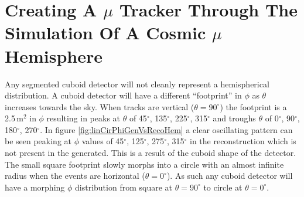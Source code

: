 \section{Creating A $\mu$ Tracker Through The Simulation Of A Cosmic $\mu$ Hemisphere}\label{sec:SimulationOfCosmics}
Any segmented cuboid detector will not cleanly represent a hemispherical distribution. 
A cuboid detector will have a different ``footprint'' in $\phi$ as $\theta$ increases towards the sky. When tracks are vertical ($\theta = 90^\circ$) the footprint is a 2.5\,m$^2$ in $\phi$ resulting in peaks at $\theta$ of 45$^\circ$, 135$^\circ$, 225$^\circ$, 315$^\circ$ and troughs $\theta$ of 0$^\circ$, 90$^\circ$, 180$^\circ$, 270$^\circ$. In figure \ref{fig:linCirPhiGenVsRecoHem} a clear oscillating pattern can be seen peaking at $\phi$ values of 45$^\circ$, 125$^\circ$, 275$^\circ$, 315$^\circ$ in the reconstruction which is not present in the generated. This is a result of the cuboid shape of the detector. The small square footprint slowly morphs into a circle with an almost infinite radius when the events are horizontal ($\theta = 0^\circ$). As such any cuboid detector will have a morphing $\phi$ distribution from square at $\theta = 90^\circ$ to circle at $\theta = 0^\circ$.
